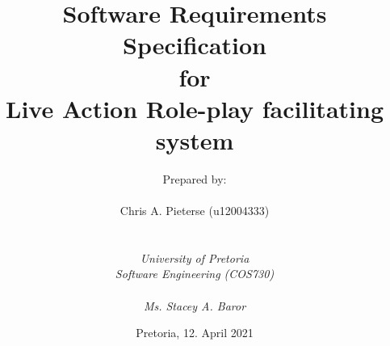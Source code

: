 
\def\Company{Private}
\def\Institute{\textit{University of Pretoria}}
\def\Course{\textit{Software Engineering (COS730)}}
\def\Module{\textit{ }}
\def\Docent{\textit{Ms. Stacey A. Baror}}
\def\Assistant{\textit{}}

\def\BoldTitle{Software Requirements Specification}

\def\Subtitle{for \\ Live Action Role-play facilitating system \\}
\def\Authors{Prepared by:\\\\ Chris A. Pieterse (u12004333) } 
\def\Shortname{A.Sandu}


\title{\textbf{\BoldTitle}\\\Subtitle}
\author{\Authors \\ \\ \\ \Institute\\ \Course\\ \Module\\ \Docent\\ \Assistant}
\date{Pretoria, 12. April 2021}

